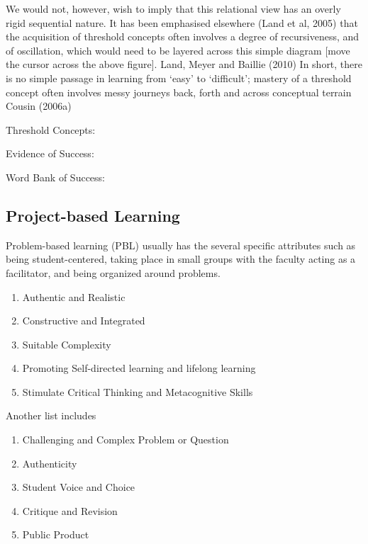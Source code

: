 \documentclass{tufte-book}\usepackage[]{graphicx}\usepackage[]{xcolor}
\begin{document}
We would not, however, wish to imply that this relational view has an overly rigid sequential nature. It has been emphasised elsewhere (Land et al, 2005) that the acquisition of threshold concepts often involves a degree of recursiveness, and of oscillation, which would need to be layered across this simple diagram [move the cursor across the above figure].
                                                                                              Land, Meyer and Baillie (2010)
In short, there is no simple passage in learning from ‘easy’ to ‘difficult’; mastery of a threshold concept often involves messy journeys back, forth and across conceptual terrain
                                                                                              Cousin (2006a)



Threshold Concepts:


Evidence of Success:

Word Bank of Success:



\subsection{Project-based Learning}

Problem-based learning (PBL) usually has the several specific attributes such as being student-centered, taking place in small groups with the faculty acting as a facilitator, and being organized around problems.

\begin{enumerate}
	\item Authentic and Realistic
	\item Constructive and Integrated
	\item Suitable Complexity
	\item Promoting Self-directed learning and lifelong learning
	\item Stimulate Critical Thinking and Metacognitive Skills
\end{enumerate}

Another list includes

\begin{enumerate}
	\item Challenging and Complex Problem or Question
	\item Authenticity
	\item Student Voice and Choice
	\item Critique and Revision
	\item Public Product
\end{enumerate}
\end{document}
